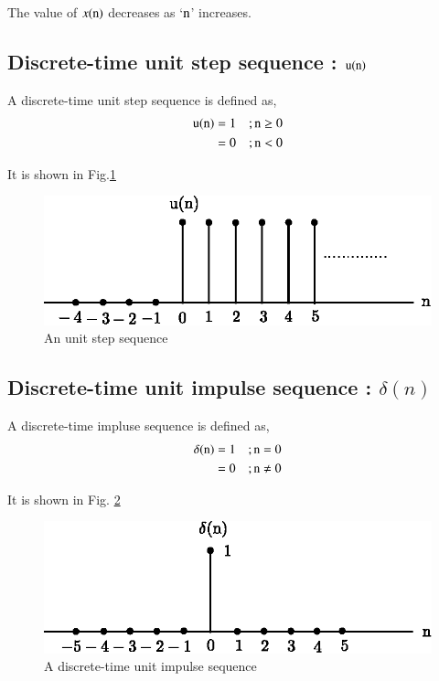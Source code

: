 The value of $x(\textrm{n})$ decreases as `$\textrm{n}$' increases.

\subsection{Discrete-time unit step sequence : $\textrm{u}(\textrm{n})$}\label{chap1-subsec-1.4.4}

A discrete-time unit step sequence is defined as,
\begin{align*}
\textrm{u}(\textrm{n}) &= 1 \quad ; \textrm{n} \geq 0\\
&= 0\quad ; \textrm{n} < 0
\end{align*}

It is shown in Fig.\ref{chap1-fig-1.17}
\begin{figure}[H]
\centering
\includegraphics{src/chap1/fig.1.17.eps}
\caption{An unit step sequence}\label{chap1-fig-1.17}
\end{figure}

\subsection{Discrete-time unit impulse sequence : $\delta(n)$}\label{chap1-subsec-1.4.5}

A discrete-time impluse sequence is defined as,
\begin{align*}
\delta(\textrm{n}) &= 1  \quad; \textrm{n}=0\\
& =0 \quad; \textrm{n} \neq 0
\end{align*}

It is shown in Fig. \ref{chap1-fig-1.18}

\begin{figure}[H]
\centering
\includegraphics{src/chap1/fig.1.18.eps}
\caption{A discrete-time unit impulse sequence}\label{chap1-fig-1.18}
\end{figure}

